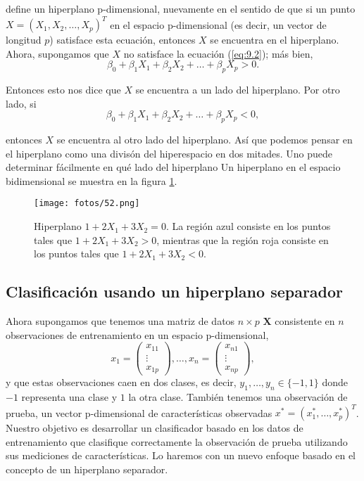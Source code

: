 define un hiperplano p-dimensional, nuevamente en el sentido de que si un punto $X = (X_1, X_2, \ldots, X_p)^T$ en el espacio p-dimensional (es decir, un vector de longitud $p$) satisface esta ecuación, entonces $X$ se encuentra en el hiperplano. \\

\noindent Ahora, supongamos que $X$ no satisface la ecuación (\ref{eq:9.2}); más bien,
\begin{equation}
\beta_0 + \beta_1 X_1 + \beta_2 X_2 + \ldots + \beta_p X_p > 0.
\end{equation}

\noindent Entonces esto nos dice que $X$ se encuentra a un lado del hiperplano. Por otro lado, si
\begin{equation}
\beta_0 + \beta_1 X_1 + \beta_2 X_2 + \ldots + \beta_p X_p < 0,
\end{equation}

entonces $X$ se encuentra al otro lado del hiperplano. Así que podemos pensar en el hiperplano como una divisón del hiperespacio en dos mitades. Uno puede determinar fácilmente en qué lado del hiperplano Un hiperplano en el espacio bidimensional se muestra en la figura \ref{fig:9.1}.

\begin{figure}[h]
\centering
\texttt{[image: fotos/52.png]}
\caption{Hiperplano $1 + 2X_1 + 3X_2 = 0$. La región azul consiste en los puntos tales que $1 + 2X_1 + 3X_2 > 0$, mientras que la región roja consiste en los puntos tales que $1 + 2X_1 + 3X_2 < 0$.}
\label{fig:9.1}
\end{figure}

\subsection{Clasificación usando un hiperplano separador}

Ahora supongamos que tenemos una matriz de datos $n \times p$ $\mathbf{X}$ consistente en $n$ observaciones de entrenamiento en un espacio p-dimensional,
\begin{equation}
x_1 =
\begin{pmatrix}
x_{11} \\
\vdots \\
x_{1p}
\end{pmatrix}, \ldots, x_n =
\begin{pmatrix}
x_{n1} \\
\vdots \\
x_{np}
\end{pmatrix},
\end{equation}
y que estas observaciones caen en dos clases, es decir, $y_1, \ldots, y_n \in \{-1, 1\}$ donde $-1$ representa una clase y $1$ la otra clase. También tenemos una observación de prueba, un vector p-dimensional de características observadas $x^* = (x^*_1, \ldots, x^*_p)^T$. Nuestro objetivo es desarrollar un clasificador basado en los datos de entrenamiento que clasifique correctamente la observación de prueba utilizando sus mediciones de características. Lo haremos con un nuevo enfoque basado en el concepto de un hiperplano separador. \\

